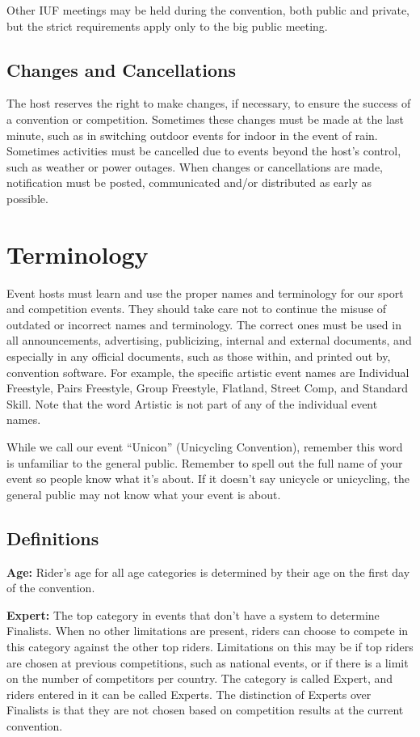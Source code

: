 Other IUF meetings may be held during the convention, both public and private, but the strict requirements apply only to the big public meeting.

\section{Changes and Cancellations}

The host reserves the right to make changes, if necessary, to ensure the success of a convention or competition.
Sometimes these changes must be made at the last minute, such as in switching outdoor events for indoor in the event of rain.
Sometimes activities must be cancelled due to events beyond the host's control, such as weather or power outages.
When changes or cancellations are made, notification must be posted, communicated and/or distributed as early as possible.

\chapter{Terminology}

Event hosts must learn and use the proper names and terminology for our sport and competition events.
They should take care not to continue the misuse of outdated or incorrect names and terminology.
The correct ones must be used in all announcements, advertising, publicizing, internal and external documents, and especially in any official documents, such as those within, and printed out by, convention software.
For example, the specific artistic event names are Individual Freestyle, Pairs Freestyle, Group Freestyle, Flatland, Street Comp, and Standard Skill.
Note that the word Artistic is not part of any of the individual event names.

While we call our event ``Unicon'' (Unicycling Convention), remember this word is unfamiliar to the general public.
Remember to spell out the full name of your event so people know what it's about.
If it doesn't say unicycle or unicycling, the general public may not know what your event is about.

\section{Definitions \label{chap:general_definitions}}

\textbf{Age:} Rider's age for all age categories is determined by their age on the first day of the convention.

\textbf{Expert:} The top category in events that don't have a system to determine Finalists.
When no other limitations are present, riders can choose to compete in this category against the other top riders.
Limitations on this may be if top riders are chosen at previous competitions, such as national events, or if there is a limit on the number of competitors per country.
The category is called Expert, and riders entered in it can be called Experts.
The distinction of Experts over Finalists is that they are not chosen based on competition results at the current convention.

